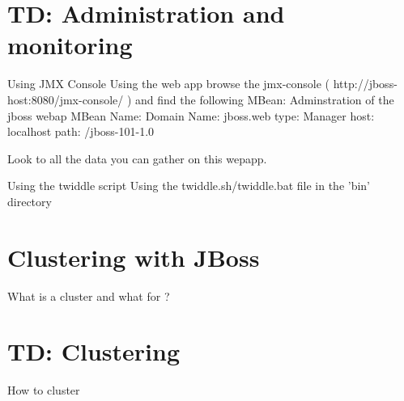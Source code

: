 \documentclass[handout]{beamer}
\begin{document}
\section{TD: Administration and monitoring}
	\begin{frame}
		\begin{block}{Using JMX Console}
			Using the web app browse the jmx-console ( http://jboss-host:8080/jmx-console/ ) and find the following MBean:
Adminstration of the jboss webap
MBean Name:  	Domain Name:  	jboss.web
	type: 	Manager
	host: 	localhost
	path: 	/jboss-101-1.0

			Look to all the data you can gather on this wepapp.
		\end{block}
		\begin{block}{Using the twiddle script}
		 	Using the twiddle.sh/twiddle.bat file in the 'bin' directory
		\end{block}

	\end{frame}
\section{Clustering with JBoss}
	\begin{frame}
		\begin{block}{What is a cluster and what for ?}	
		\end{block}
	\end{frame}
\section{TD: Clustering}
	\begin{frame}
		\begin{block}{How to cluster}
		\end{block}
	\end{frame}
\end{document}
